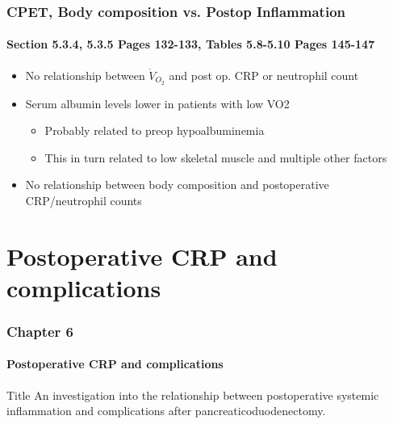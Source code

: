 \documentclass[10pt]{beamer}
\begin{document}
\begin{frame}
	\frametitle{CPET, Body composition vs. Postop Inflammation }
	\framesubtitle{Section 5.3.4, 5.3.5 Pages 132-133, Tables 5.8-5.10 Pages 145-147 }
	\begin{itemize}
		\item No relationship between $\dot{V}_{O_2}$ and post op. CRP or neutrophil count
		\vfill
		\item Serum albumin levels lower in patients with low VO2
		\begin{itemize}
			\item Probably related to preop hypoalbuminemia
			\item This in turn related to low skeletal muscle and multiple other factors
		\end{itemize}
		\vfill
		\item No relationship between body composition and postoperative CRP/neutrophil counts
	\end{itemize}
\end{frame}


\section[Chapter 6]{Postoperative CRP and complications}
\begin{frame}
	\frametitle{Chapter 6}
	\framesubtitle{Postoperative CRP and complications}
	\begin{block}{Title}
		An investigation into the relationship between postoperative systemic inflammation and complications after pancreaticoduodenectomy.
	\end{block}
\end{frame}
\end{document}
